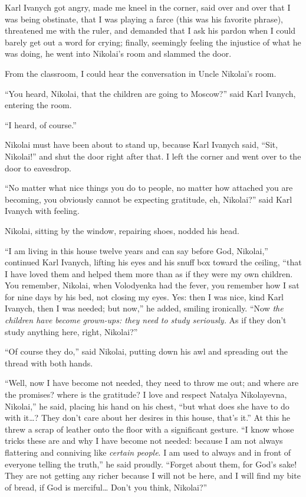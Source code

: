 Karl Ivanych got angry, made me kneel in the corner, said over and over that I was being obstinate, that I was playing a farce (this was his favorite phrase), threatened me with the ruler, and demanded that I ask his pardon when I could barely get out a word for crying; finally, seemingly feeling the injustice of what he was doing, he went into Nikolai's room and slammed the door.

From the classroom, I could hear the conversation in Uncle Nikolai's room.

``You heard, Nikolai, that the children are going to Moscow?'' said Karl Ivanych, entering the room. %

``I heard, of course.'' %

Nikolai must have been about to stand up, because Karl Ivanych said, ``Sit, Nikolai!'' and shut the door right after that. I left the corner and went over to the door to eavesdrop.

``No matter what nice things you do to people, no matter how attached you are becoming, you obviously cannot be expecting gratitude, eh, Nikolai?'' said Karl Ivanych with feeling. %

Nikolai, sitting by the window, repairing shoes, nodded his head.

``I am living in this house twelve years and can say before God, Nikolai,'' continued Karl Ivanych, lifting his eyes and his snuff box toward the ceiling, ``that I have loved them and helped them more than as if they were my own children. You remember, Nikolai, when Volodyenka had the fever, you remember how I sat for nine days by his bed, not closing my eyes. Yes: then I was nice, kind Karl Ivanych, then I was needed; but now,'' he added, smiling ironically. ``Now \emph{the children have become grown-ups: they need to study seriously.} As if they don't study anything here, right, Nikolai?'' %

``Of course they do,'' said Nikolai, putting down his awl and spreading out the thread with both hands. %

``Well, now I have become not needed, they need to throw me out; and where are the promises? where is the gratitude? I love and respect Natalya Nikolayevna, Nikolai,'' he said, placing his hand on his chest, ``but what does she have to do with it\ldots{}? They don't care about her desires in this house, that's it.'' At this he threw a scrap of leather onto the floor with a significant gesture. ``I know whose tricks these are and why I have become not needed: because I am not always flattering and conniving like \emph{certain people}. I am used to always and in front of everyone telling the truth,'' he said proudly. ``Forget about them, for God's sake! They are not getting any richer because I will not be here, and I will find my bite of bread, if God is merciful\ldots{} Don't you think, Nikolai?'' %


